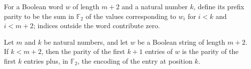 \begin{definition}
\label{FABL.boolPrefixParity}
\leanok
{}
For a Boolean word $w$ of length $m+2$ and a natural number $k$, define its prefix
parity to be the sum in $\mathbb{F}_2$ of the values corresponding to $w_i$ for $i<k$
and $i<m+2$; indices outside the word contribute zero.
\end{definition}

\begin{theorem}
\label{FABL.boolPrefixParity_succ}
\leanok
{}
Let $m$ and $k$ be natural numbers, and let $w$ be a Boolean string of length $m+2$. If
$k<m+2$, then the parity of the first $k+1$ entries of $w$ is the parity of the first
$k$ entries plus, in $\mathbb{F}_2$, the encoding of the entry at position $k$.
\end{theorem}

